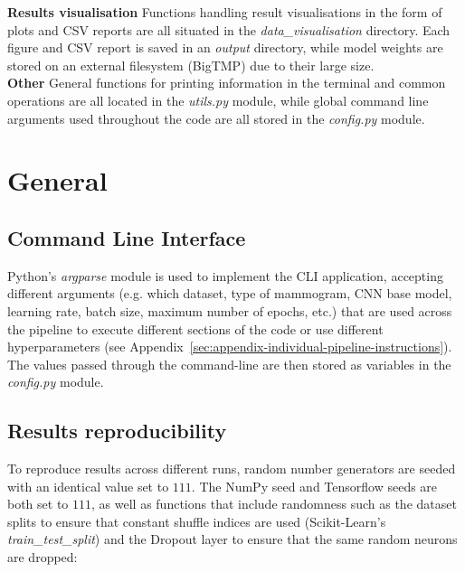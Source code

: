 \textbf{Results visualisation} \space Functions handling result visualisations in the form of plots and CSV reports are all situated in the \textit{data\_visualisation} directory. Each figure and CSV report is saved in an \textit{output} directory, while model weights are stored on an external filesystem (BigTMP) due to their large size.\\

\textbf{Other} \space General functions for printing information in the terminal and common operations are all located in the \textit{utils.py} module, while global command line arguments used throughout the code are all stored in the \textit{config.py} module.


\section{General}

\subsection{Command Line Interface}

Python's \textit{argparse} module is used to implement the CLI application, accepting different arguments (e.g. which dataset,  type of mammogram, CNN base model, learning rate, batch size, maximum number of epochs, etc.) that are used across the pipeline to execute different sections of the code or use different hyperparameters (see Appendix~\ref{sec:appendix-individual-pipeline-instructions}). The values passed through the command-line are then stored as variables in the \textit{config.py} module.

\subsection{Results reproducibility}

To reproduce results across different runs, random number generators are seeded with an identical value set to \textit{$111$}. The NumPy seed and Tensorflow seeds are both set to \textit{$111$}, as well as functions that include randomness such as the dataset splits to ensure that constant shuffle indices are used (Scikit-Learn's \textit{train\_test\_split}) and the Dropout layer to ensure that the same random neurons are dropped:

